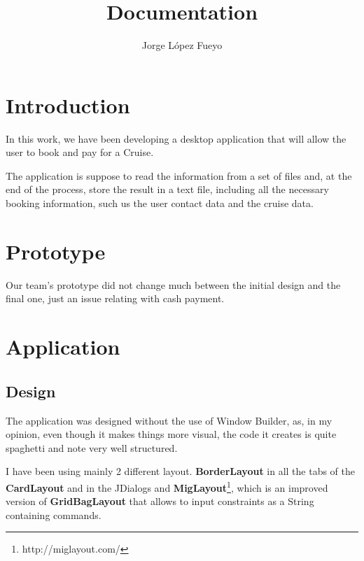 \documentclass{article}
\title{Documentation}
\author{Jorge López Fueyo}
\begin{document}
   \maketitle
   \newpage
     
   \section{Introduction}
   
   In this work, we have been developing a desktop application that will allow the user to book and pay for a Cruise.

   The application is suppose to read the information from a set of files and, at the end of the process, store the result in a text file, including all the necessary booking information, such us the user contact data and the cruise data.
   
   \section{Prototype}
   Our team's prototype did not change much between the initial design and the final one, just an issue relating with cash payment.
   
   \section{Application}
   \subsection{Design}
   The application was designed without the use of Window Builder, as, in my opinion, even though it makes things more visual, the code it creates is quite spaghetti and note very well structured.
   
   I have been using mainly 2 different layout. \textbf{BorderLayout} in all the tabs of the \textbf{CardLayout} and in the JDialogs and \textbf{MigLayout}\footnote{http://miglayout.com/}, which is an improved  version of \textbf{GridBagLayout} that allows to input constraints as a String containing commands.
   
\end{document}
